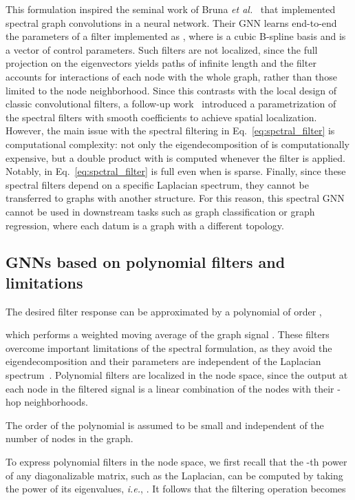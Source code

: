 \documentclass{article}
\begin{document}
This formulation inspired the seminal work of Bruna \emph{et al.}~\cite{bruna2013spectral} that implemented spectral graph convolutions in a neural network. 
Their GNN learns end-to-end the parameters of a filter implemented as , where  is a cubic B-spline basis and  is a vector of control parameters. 
Such filters are not localized, since the full projection on the eigenvectors yields paths of infinite length and the filter accounts for interactions of each node with the whole graph, rather than those limited to the node neighborhood.
Since this contrasts with the local design of classic convolutional filters, a follow-up work~\cite{henaff2015deep} introduced a parametrization of the spectral filters with smooth coefficients to achieve spatial localization.
However, the main issue with the spectral filtering in Eq.~\eqref{eq:spctral_filter} is computational complexity: not only the eigendecomposition of  is computationally expensive, but a double product with  is computed whenever the filter is applied.
Notably,  in Eq.~\eqref{eq:spctral_filter} is full even when  is sparse. 
Finally, since these spectral filters depend on a specific Laplacian spectrum, they cannot be transferred to graphs with another structure. 
For this reason, this spectral GNN cannot be used in downstream tasks such as graph classification or graph regression, where each datum is a graph with a different topology.

\subsection{GNNs based on polynomial filters and limitations}
\label{sec:poly_and_limitations}

The desired filter response  can be approximated by a polynomial of order ,

which performs a weighted moving average of the graph signal \cite{tremblay2018design}.
These filters overcome important limitations of the spectral formulation, as they avoid the eigendecomposition and their parameters are independent of the Laplacian spectrum~\cite{zhang2018end}.
Polynomial filters are localized in the node space, since the output at each node in the filtered signal is a linear combination of the nodes with their -hop neighborhoods.

The order of the polynomial  is assumed to be small and independent of the number  of nodes in the graph.

To express polynomial filters in the node space, we first recall that the -th power of any diagonalizable matrix, such as the Laplacian, can be computed by taking the power of its eigenvalues, \emph{i.e.}, .
It follows that the filtering operation becomes
\end{document}
